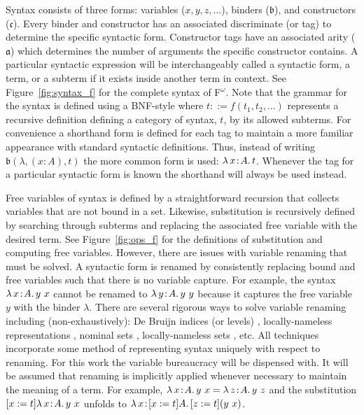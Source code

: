 

Syntax consists of three forms: variables ($x, y, z, \ldots$), binders ($\mathfrak{b}$), and constructors ($\mathfrak{c}$).
Every binder and constructor has an associated discriminate (or tag) to determine the specific syntactic form.
Constructor tags have an associated arity ($\mathfrak{a}$) which determines the number of arguments the specific constructor contains.
A particular syntactic expression will be interchangeably called a syntactic form, a term, or a subterm if it exists inside another term in context.
See Figure~\ref{fig:syntax_f} for the complete syntax of F$^\omega$.
Note that the grammar for the syntax is defined using a BNF-style \cite{floyd1961_bnf} where $t ::= f(t_1, t_2, \ldots)$ represents a recursive definition defining a category of syntax, $t$, by its allowed subterms.
For convenience a shorthand form is defined for each tag to maintain a more familiar appearance with standard syntactic definitions.
Thus, instead of writing $\mathfrak{b}(\lambda, (x : A), t)$ the more common form is used: ${\lambda}\, x\! : \! A.\, t$.
Whenever the tag for a particular syntactic form is known the shorthand will always be used instead.



Free variables of syntax is defined by a straightforward recursion that collects variables that are not bound in a set.
Likewise, substitution is recursively defined by searching through subterms and replacing the associated free variable with the desired term.
See Figure~\ref{fig:ops_f} for the definitions of substitution and computing free variables.
However, there are issues with variable renaming that must be solved.
A syntactic form is renamed by consistently replacing bound and free variables such that there is no variable capture.
For example, the syntax ${\lambda}\, x\! : \! A.\, y\ x$ cannot be renamed to ${\lambda}\, y\! : \! A.\, y\ y$ because it captures the free variable $y$ with the binder $\lambda$.
There are several rigorous ways to solve variable renaming including (non-exhaustively): De Bruijn indices (or levels) \cite{debruijn1972}, locally-nameless representations \cite{chargueraud2012}, nominal sets \cite{pitts2013_nominal}, locally-nameless sets \cite{pitts2023_lns}, etc.
All techniques incorporate some method of representing syntax uniquely with respect to renaming.
For this work the variable bureaucracy will be dispensed with.
It will be assumed that renaming is implicitly applied whenever necessary to maintain the meaning of a term.
For example, $\abs{\lambda}{x}{A}{y\ x} = \abs{\lambda}{z}{A}{y\ z}$ and the substitution $[x := t]{\lambda}\, x\! : \! A.\, y\ x$ unfolds to $\abs{\lambda}{x}{[x := t]A}{[z := t](y\ x)}$.


